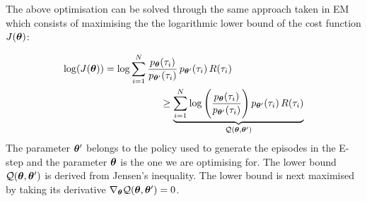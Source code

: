 \begin{appendices}
The above optimisation can be solved through the same approach taken in EM which consists of 
maximising the the logarithmic lower bound of the cost function $J(\boldsymbol{\theta})$: 




\begin{align}
  \log( J(\boldsymbol{\theta}) )  &= \log \sum\limits_{i=1}^{N} \frac{p_{\boldsymbol{\theta}}(\tau_i)}{p_{\boldsymbol{\theta}'}(\tau_i)} \, p_{\boldsymbol{\theta}'}(\tau_i) \, R(\tau_i) \hspace*{2cm}  \nonumber \\
		     & \hspace*{2cm} \geq \underbrace{\sum\limits_{i=1}^{N} \log\Bigg( \frac{p_{\boldsymbol{\theta}}(\tau_i)}{p_{\boldsymbol{\theta}'}(\tau_i)}\Bigg) \, p_{\boldsymbol{\theta}'}(\tau_i) \, R(\tau_i)}_{\mathcal{Q}(\boldsymbol{\theta},\boldsymbol{\theta}')} \label{eq:lower_bound}
\end{align}
The parameter $\boldsymbol{\theta}'$ belongs to the policy used to generate the episodes in the E-step and the parameter $\boldsymbol{\theta}$ is the one 
we are optimising for. The lower bound $\mathcal{Q}(\boldsymbol{\theta},\boldsymbol{\theta}')$ is derived from Jensen's inequality. 
The lower bound is next maximised by taking its derivative $\nabla_{\boldsymbol{\theta}}\mathcal{Q}(\boldsymbol{\theta},\boldsymbol{\theta}') = 0$. 


\end{appendices}
